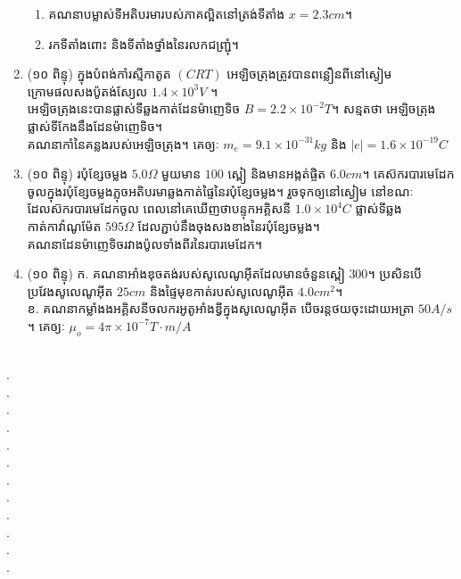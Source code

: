 \documentclass{officialexam}
\begin{document}
\begin{enumerate}[m]
	\begin{enumerate}[k]
		\item គណនាបម្លាស់ទីអតិបរមារបស់ភាគល្អិតនៅត្រង់ទីតាំង $x=2.3cm$។
		\item រកទីតាំងពោះ និងទីតាំងថ្នាំងនៃរលកជញ្ជ្រុំ។
	\end{enumerate}
	\item {\color{khtug}\kml(១០ ពិន្ទុ)} ក្នុងបំពង់កាំរស្មីកាតូត $\left(CRT\right)$ អេឡិចត្រុងត្រូវបានពន្លឿនពីនៅស្ងៀមក្រោមផលសងប៉ូតង់ស្យែល $1.4\times10^3V$ ។ \\អេឡិចត្រុងនេះបានផ្លាស់ទីឆ្លងកាត់ដែនម៉ាញេទិច $B=2.2\times10^{-2}T$។ សន្មតថា អេឡិចត្រុងផ្លាស់ទីកែងនឹងដែនម៉ាញេទិច។ \\
	គណនាកាំនៃគន្លងរបស់អេឡិចត្រុង។ គេឲ្យៈ $m_e=9.1\times10^{-31}kg$ និង $|e|=1.6\times10^{-19}C$
	\item {\color{khtug}\kml(១០ ពិន្ទុ)} របុំខ្សែចម្លង $5.0\Omega$ មួយមាន $100$ ស្ពៀ និងមានអង្កត់ផ្ចិត $6.0cm$។ គេស៊ករបារមេដែកចូលក្នុងរបុំខ្សែចម្លងភ្លុចអតិបរមាឆ្លងកាត់ផ្ទៃនៃរបុំខ្សែចម្លង។ រួចទុកឲ្យនៅស្ងៀម នៅខណៈដែលស៊ករបារមេដែកចូល ពេលនៅគេឃើញថាបន្ទុកអគ្គិសនី $1.0\times10^{4}C$ ផ្លាស់ទីឆ្លងកាត់កាវ៉ាណូម៉ែត $595\Omega$ ដែលភ្ជាប់នឹងចុងសងខាងនៃរបុំខ្សែចម្លង។\\
	គណនាដែនម៉ាញេទិចរវាងប៉ូលទាំងពីរនៃរបារមេដែក។
	\item {\color{khtug}\kml(១០ ពិន្ទុ)} {\color{khtug} ក.} គណនាអាំងឌុចតង់របស់សូលេណូអុីតដែលមានចំនួនស្ពៀ $300$។ ប្រសិនបើប្រវែងសូលេណូអុីត $25cm$ និងផ្ទៃមុខកាត់របស់សូលេណូអុីត $4.0cm^2$។\\
	{\color{khtug} ខ.} គណនាកម្លាំងងអគ្គិសនីចលករអូតូអាំងឌ្វីក្នុងសូលេណូអុីត បើចរន្តថយចុះដោយអត្រា $50A/s$។ គេឲ្យៈ $\mu_o=4\pi\times10^{-7}T\cdot m/A$
\end{enumerate}\newpage
{}\\
{\color{white}.}\dotfill\\
{\color{white}.}\dotfill\\
{\color{white}.}\dotfill
\\
{\color{white}.}\dotfill\\
{\color{white}.}\dotfill\\
{\color{white}.}\dotfill
\\
{\color{white}.}\dotfill\\
{\color{white}.}\dotfill\\
{\color{white}.}\dotfill
\\
{\color{white}.}\dotfill\\
{\color{white}.}\dotfill\\
{\color{white}.}\dotfill
\\
\end{document}
